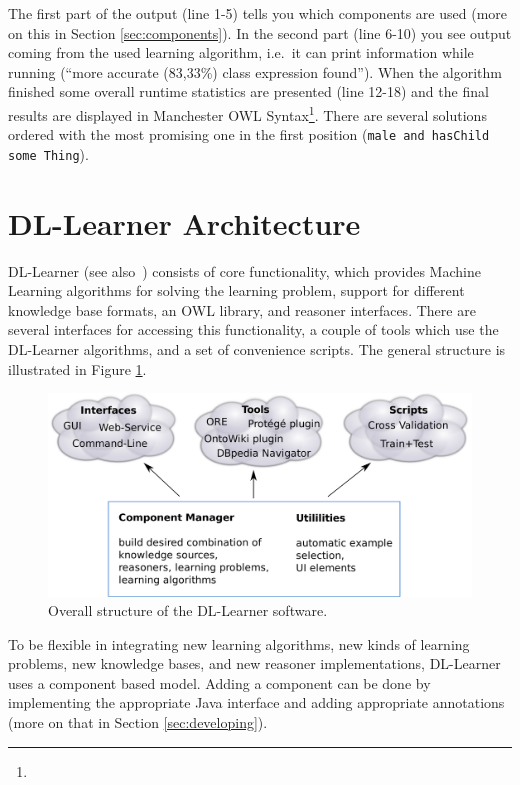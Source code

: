 \documentclass[a4paper,12pt]{scrartcl}
\begin{document}
The first part of the output (line 1-5) tells you which components are used (more on this in Section \ref{sec:components}). In the second part (line 6-10) you see output coming from the used learning algorithm, i.e.~it can print information while running (``more accurate (83,33\%) class expression found''). When the algorithm finished some overall runtime statistics are presented (line 12-18) and the final results are displayed in Manchester OWL Syntax\footnote{\mos}. There are several solutions ordered with the most promising one in the first position (\verb|male and hasChild some Thing|).

\section{DL-Learner Architecture}

DL-Learner (see also~\cite{dllearner_jmlr}) consists of core functionality, which provides Machine Learning algorithms for solving the learning problem, support for different knowledge base formats, an OWL library, and reasoner interfaces. There are several interfaces for accessing this functionality, a couple of tools which use the DL-Learner algorithms, and a set of convenience scripts. The general structure is illustrated in Figure \ref{fig:structure}.

\begin{figure}
 \includegraphics[width=\textwidth]{../../../../images/structure_print.pdf}
 \caption{Overall structure of the DL-Learner software.}
 \label{fig:structure}
\end{figure}

To be flexible in integrating new learning algorithms, new kinds of learning problems, new knowledge bases, and new reasoner implementations, DL-Learner uses a component based model. Adding a component can be done by implementing the appropriate Java interface and adding appropriate annotations (more on that in Section \ref{sec:developing}).
\end{document}
